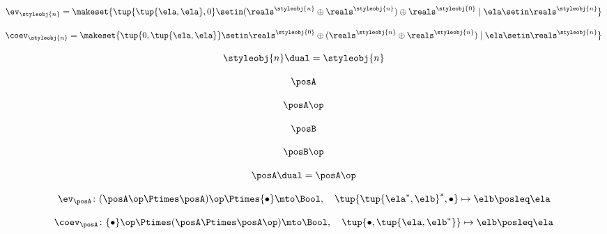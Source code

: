 \begin{forslides}
     \begin{equation}
        \label{eq:slides_trace_monoidal_19}
       \ev_\styleobj{n} = \makeset{\tup{\tup{\ela, \ela},0} \setin (\reals^\styleobj{n} \oplus \reals^\styleobj{n}) \oplus \reals^\styleobj{0} \mid \ela \setin \reals^\styleobj{n}}
    \end{equation}
    
     \begin{equation}
        \label{eq:slides_trace_monoidal_20}
       \coev_\styleobj{n} = \makeset{\tup{0, \tup{\ela, \ela}} \setin \reals^\styleobj{0} \oplus (\reals^\styleobj{n} \oplus \reals^\styleobj{n}) \mid \ela \setin \reals^\styleobj{n}}
    \end{equation}
    
     \begin{equation}
        \label{eq:slides_trace_monoidal_21}
       \styleobj{n}\dual = \styleobj{n}
    \end{equation}
    
     \begin{equation}
        \label{eq:slides_trace_monoidal_22}
       \posA 
    \end{equation}
    
     \begin{equation}
        \label{eq:slides_trace_monoidal_23}
       \posA\op
    \end{equation}
    
     \begin{equation}
        \label{eq:slides_trace_monoidal_24}
       \posB
    \end{equation}
    
    \begin{equation}
        \label{eq:slides_trace_monoidal_25}
       \posB\op
    \end{equation}
    
     \begin{equation}
        \label{eq:slides_trace_monoidal_26}
       \posA\dual = \posA\op
    \end{equation}
    
     \begin{equation}
        \label{eq:slides_trace_monoidal_27}
       \ev_\posA \colon (\posA\op \Ptimes \posA)\op \Ptimes \{ \bullet \} \mto \Bool, \quad \tup{\tup{\ela^*, \elb}^*, \bullet} \mapsto \elb \posleq \ela
    \end{equation}
    
     \begin{equation}
        \label{eq:slides_trace_monoidal_28}
       \coev_\posA \colon \{ \bullet \}\op \Ptimes (\posA \Ptimes \posA\op)   \mto \Bool, \quad \tup{\bullet, \tup{\ela, \elb^*}} \mapsto \elb \posleq \ela
    \end{equation}
    

\end{forslides}
